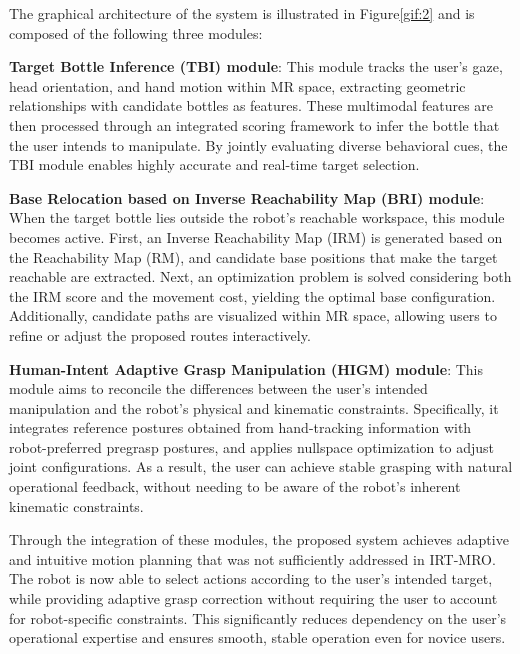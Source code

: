 \documentclass[../../main.tex]{subfiles} %
\begin{document}
The graphical architecture of the system is illustrated in Figure\ref{gif:2}
and is composed of the following three modules:

\medskip
\noindent
\textbf{Target Bottle Inference (TBI) module}:  
This module tracks the user’s gaze, head orientation, and hand motion within MR space, 
extracting geometric relationships with candidate bottles as features.  
These multimodal features are then processed through an integrated scoring framework 
to infer the bottle that the user intends to manipulate.  
By jointly evaluating diverse behavioral cues, 
the TBI module enables highly accurate and real-time target selection.

\medskip
\noindent
\textbf{Base Relocation based on Inverse Reachability Map (BRI) module}:  
When the target bottle lies outside the robot’s reachable workspace, 
this module becomes active.  
First, an Inverse Reachability Map (IRM) is generated based on the Reachability Map (RM)\cite{RM}, 
and candidate base positions that make the target reachable are extracted.  
Next, an optimization problem is solved considering both the IRM score 
and the movement cost, yielding the optimal base configuration.  
Additionally, candidate paths are visualized within MR space, 
allowing users to refine or adjust the proposed routes interactively.

\medskip
\noindent
\textbf{Human-Intent Adaptive Grasp Manipulation (HIGM) module}:  
This module aims to reconcile the differences between the user’s intended manipulation 
and the robot’s physical and kinematic constraints.  
Specifically, it integrates reference postures obtained from hand-tracking information 
with robot-preferred pregrasp postures, 
and applies nullspace optimization to adjust joint configurations.  
As a result, the user can achieve stable grasping with natural operational feedback, 
without needing to be aware of the robot’s inherent kinematic constraints.

\medskip
Through the integration of these modules, 
the proposed system achieves adaptive and intuitive motion planning 
that was not sufficiently addressed in IRT-MRO.  
The robot is now able to select actions according to the user’s intended target, 
while providing adaptive grasp correction without requiring the user to 
account for robot-specific constraints.  
This significantly reduces dependency on the user’s operational expertise 
and ensures smooth, stable operation even for novice users.
\end{document}
